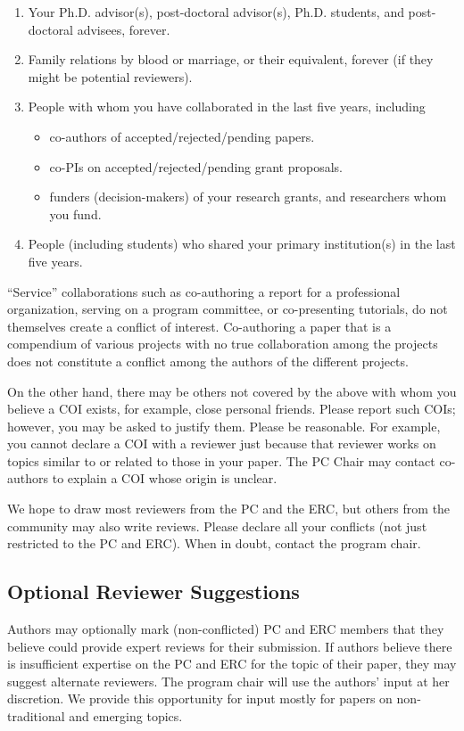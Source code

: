 \documentclass[pageno]{jpaper}
\begin{document}
\begin{enumerate}
\item Your Ph.D. advisor(s), post-doctoral advisor(s), Ph.D. students,
      and post-doctoral advisees, forever.
\item Family relations by blood or marriage, or their equivalent,
      forever (if they might be potential reviewers).
\item People with whom you have collaborated in the last five years, including
\begin{itemize}
\item co-authors of accepted/rejected/pending papers.
\item co-PIs on accepted/rejected/pending grant proposals.
\item funders (decision-makers) of your research grants, and researchers
      whom you fund.
\end{itemize}
\item People (including students) who shared your primary institution(s) in the
last five years.
\end{enumerate}

``Service'' collaborations such as co-authoring a report for a professional
organization, serving on a program committee, or co-presenting
tutorials, do not themselves create a conflict of interest.
Co-authoring a paper that is a compendium of various projects with
no true collaboration among the projects does not constitute a
conflict among the authors of the different projects.

On the other hand, there may be others not covered by the above	with whom
you believe a COI exists, for example, close personal friends.
Please report such COIs; however, you may be asked to justify them.
Please be reasonable.	For example, you cannot declare a COI with a
reviewer just because that reviewer works on topics similar to or
related to those in your paper.
The PC Chair may contact co-authors to explain a COI whose origin is unclear.

We hope to draw most reviewers from the PC and the ERC, but others from the
community may also write reviews.  Please declare all your conflicts (not
just restricted to the PC and ERC).  When in doubt, contact the program
chair.


\subsection{Optional Reviewer Suggestions}

Authors may optionally mark (non-conflicted) PC and ERC members that they
believe could provide expert reviews for their submission.  If authors
believe there is insufficient expertise on the PC and ERC for the topic of
their paper, they may suggest alternate reviewers.  The program chair will
use the authors' input at her discretion.  We provide this opportunity
for input mostly for papers on non-traditional and emerging topics.
\end{document}
